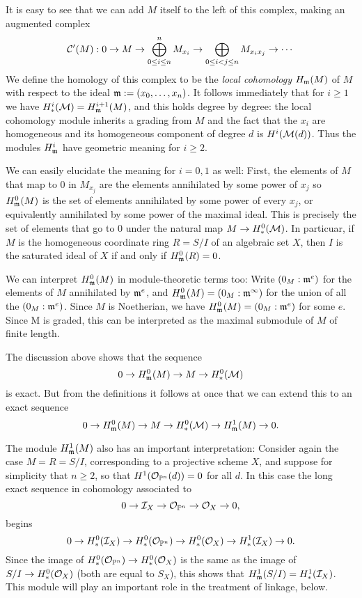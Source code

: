 It is easy to see that we can add $M$ itself to the left of this complex, making an augmented complex
$$
\cC'(M): 0\to M \to \bigoplus_{0\leq i \leq n}^{n} M_{x_{i}} \to \bigoplus_{0\leq i<j\leq n} M_{x_{i}x_{j}} \to \cdots
$$
We define the homology of this complex to be the \emph{local cohomology} $H_{\gm}(M)$ of $M$ with respect to the ideal $\gm := (x_{0},\dots,x_{n})$. It follows immediately that for $i\geq 1$ we have
$H^{i}_{*}(\cM) = H^{i+1}_{\gm}(M)$, and this holds degree by degree: the local cohomology module inherits a grading from $M$ and the fact that the $x_{i}$ are homogeneous and its homogeneous component of degree $d$ is
$H^{i}(\cM(d))$. Thus the modules $H_{\gm}^{i}$ have geometric meaning for $i\geq 2$. 

We can easily elucidate the meaning for $i=0,1$ as well: First, the elements of $M$ that map to 0 in $M_{x_{j}}$ are the elements annihilated by some power of $x_{j}$ so $H^{0}_{\gm}(M)$ is the set of elements annihilated by some power of every $x_{j}$, or equivalently annihilated by some power of the maximal ideal. This is precisely the set of elements that go to 0 under the natural map
$M\to H^{0}_{*}(\cM)$.  In particuar, if
$M$ is the homogeneous coordinate ring $R = S/I$ of an algebraic set $X$, then $I$ is the saturated ideal of $X$ if and only if $H^{0}_{\gm}(R) = 0$.

We can interpret $H^{0}_{\gm}(M)$ in module-theoretic terms too: Write 
$(0_{M}:\gm^{e})$ for the elements of $M$ annihilated by $\gm^{e}$, and 
$H^{0}_{\gm}(M) =(0_{M}:\gm^{\infty})$ for the union of all the $(0_{M}:\gm^{e})$. Since $M$ is Noetherian, we have
$H^{0}_{\gm}(M) =(0_{M}:\gm^{e})$ for some $e$.  Since M is graded, this can be interpreted as the maximal submodule of $M$ of finite length. 

The discussion above shows that the sequence
$$
0 \to H^{0}_{\gm} (M) \to M\to H^{0}_{*}(\cM)
$$
is exact. But from the definitions it follows at once that we can extend this to an exact sequence
$$
0 \to H^{0}_{\gm} (M) \to M\to H^{0}_{*}(\cM) \to H^{1}_{\gm} (M) \to 0.
$$




The module $H^{1}_{\gm}(M)$ also has an important interpretation: Consider again the case $M = R = S/I$, corresponding to a projective scheme $X$, and suppose for simplicity that 
$n\geq 2$, so that $H^{1}(\cO_{\PP^{n}}(d)) = 0$ for all $d$. In this case the long exact sequence in cohomology associated to 
$$
0\to \cI_{X} \to \cO_{\PP^{n}} \to \cO_{X}\to 0,
$$
begins
$$
0\to H^{0}_{*}(\cI_{X}) \to H^{0}_{*}(\cO_{\PP^{n}}) \to H^{0}_{*}(\cO_{X})\to H^{1}_{*}(\cI_{X}) \to 0.
$$
Since the image of $H^{0}_{*}(\cO_{\PP^{n}}) \to H^{0}_{*}(\cO_{X})$ is  the same as
the image of $S/I \to H^{0}_{*}(\cO_{X})$ (both are equal to $S_{X}$), 
this shows that $H^{1}_{\gm}(S/I) = H^{1}_{*}(\cI_{X})$. This module will play an important role in the treatment of linkage, below.

